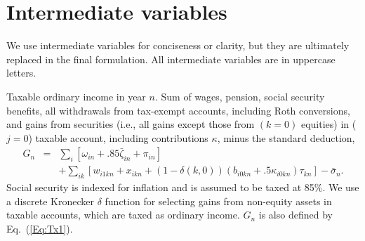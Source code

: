 \documentclass{article}[fleqn,12pt]
\begin{document}
\section{Intermediate variables}
We use intermediate variables for conciseness or clarity,
but they are ultimately replaced in the final formulation.
All intermediate variables are in uppercase letters.
\begin{description}[leftmargin=4em,style=multiline]
\item [$G_n$]
	Taxable ordinary income in year $n$. Sum of wages, pension, social security benefits, all withdrawals
	from tax-exempt accounts, including Roth conversions, and gains from securities
	(i.e., all gains except those from $(k=0)$ equities)
	in ($j=0$) taxable account, including contributions $\kappa$, minus the standard deduction,
	\begin{eqnarray}
		\label{Eq:Tx2}
		G_n &=& \sum_{i} [\omega_{in} + .85\bar\zeta_{in} + \pi_{in}] \nonumber \\
		&& + \sum_{ik} [w_{i1kn} + x_{ikn} +
		(1-\delta(k, 0))(b_{i0kn} + .5\kappa_{i0kn})\tau_{kn}] - \bar{\sigma}_n.
	\end{eqnarray}
	Social security is indexed for inflation and is assumed to be taxed at 85\%.
	We use a discrete Kronecker $\delta$ function for selecting gains from non-equity assets in
	taxable accounts, which are taxed as ordinary income. $G_n$ is also defined by Eq.~(\ref{Eq:Tx1}).


\end{description}
\end{document}
